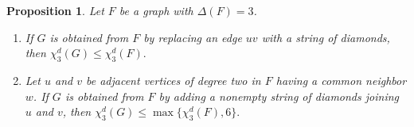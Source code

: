 \documentclass[a4paper,11pt]{article}
\newtheorem{proposition}[theorem] {Proposition}
\theoremstyle{case}
\numberwithin{subcase}{case}
\begin{document}

\begin{proposition}\label{prop:chi3Gleqchi3F}
Let $F$ be a graph with $\Delta(F)=3$.

\begin{enumerate}
    \item If $G$ is obtained from $F$ by replacing an edge $uv$ with a
    string of diamonds, then
    ${\chi_3^d(G)\leq \chi_3^d(F).}$
    \item Let $u$ and $v$ be adjacent vertices of degree two in $F$
    having a common neighbor $w$. If $G$ is obtained from $F$ by adding
    a nonempty string of diamonds joining $u$ and $v$, then
    $
        \chi_3^d(G)\leq \max\{\chi_3^d(F),6\}.
    $
\end{enumerate}
\end{proposition}
\end{document}
